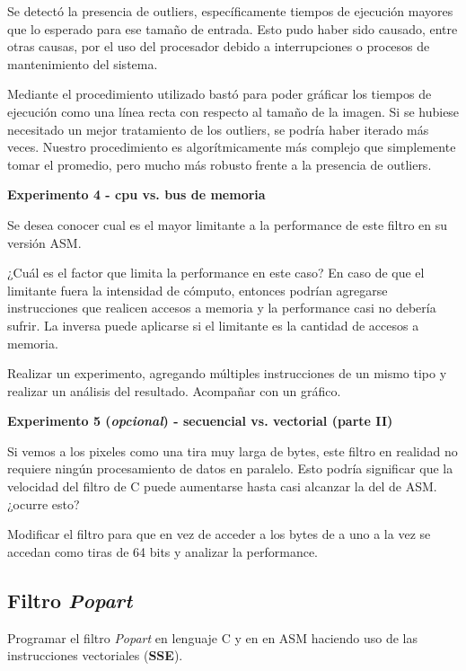 Se detectó la presencia de outliers, específicamente tiempos de ejecución mayores que lo esperado para ese tamaño de entrada. Esto pudo haber
sido causado, entre otras causas, por el uso del procesador debido a interrupciones o procesos de mantenimiento del sistema.

Mediante el procedimiento utilizado bastó para poder gráficar los tiempos de ejecución como una línea recta con respecto al tamaño de la imagen.
Si se hubiese necesitado un mejor tratamiento de los outliers, se podría haber iterado más veces. Nuestro procedimiento es algorítmicamente más
complejo que simplemente tomar el promedio, pero mucho más robusto frente a la presencia de outliers.


\vspace*{0.3cm} \noindent
\textbf{Experimento 4 - cpu vs. bus de memoria}

	Se desea conocer cual es el mayor limitante a la performance de este filtro en su versión ASM.

	¿Cuál es el factor que limita la performance en este caso? En caso de que el limitante
	fuera la intensidad de cómputo, entonces podrían agregarse instrucciones que realicen
	accesos a memoria y la performance casi no debería sufrir. La inversa puede aplicarse
	si el limitante es la cantidad de accesos a memoria.
	
	Realizar un experimento, agregando múltiples instrucciones de un mismo tipo y realizar un análisis
	del resultado. Acompañar con un gráfico.

\vspace*{0.3cm} \noindent
\textbf{Experimento 5 (\textit{opcional}) - secuencial vs. vectorial (parte II)}

	Si vemos a los pixeles como una tira muy larga de bytes, este filtro en
	realidad no requiere ningún procesamiento de datos en paralelo. Esto podría
	significar que la velocidad del filtro de C puede aumentarse hasta casi
	alcanzar la del de ASM. ¿ocurre esto?
	
	Modificar el filtro para que en vez de acceder a los bytes de a uno a la vez
	se accedan como tiras de 64 bits y analizar la performance.


\subsection*{Filtro \textit{Popart}}

  Programar el filtro \textit{Popart} en lenguaje C y en en ASM haciendo uso de 
  las instrucciones vectoriales (\textbf{SSE}).

